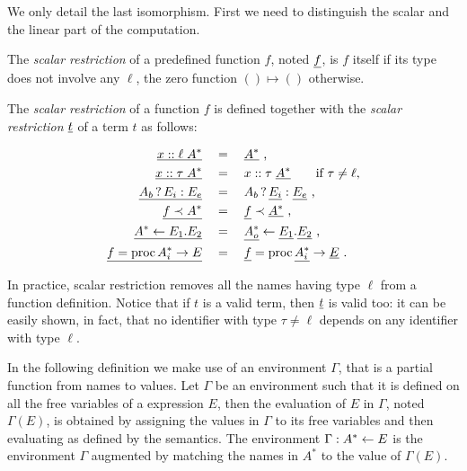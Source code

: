 We only detail the last isomorphism. First we need to distinguish the
scalar and the linear part of the computation.

\begin{definition}
  The \emph{scalar restriction} of a predefined function $f$, noted
  $\underline{f}$, is $f$ itself if its type does not involve any $\ell$, the
  zero function $()\mapsto()$ otherwise. 

  The \emph{scalar restriction} of a \tAL{} function $f$ is defined
  together with the \emph{scalar restriction} $\underline{t}$ of a \tAL{} term
  $t$ as follows:

  \begin{align}
    \underline{x::\ell\;A^\ast} &\quad=\quad \underline{A^\ast} \text{ ,}\\
    \underline{x::\tau\;A^\ast} &\quad=\quad x::\tau\;\underline{A^\ast}
    \qquad\text{if $\tau\ne\ell$,}\\
    \underline{A_b\,?\,E_i:E_e} &\quad=\quad A_b\,?\,\underline{E_i}:\underline{E_e} \text{ ,}\\
    \notag
    \label{eq:scalar-let}
    \underline{f \prec A^\ast} &\quad=\quad \underline{f} \prec \underline{A^\ast}
    \text{ ,}\\
    \underline{A^\ast\leftarrow E_1.E_2} &\quad=\quad \underline{A_o^\ast}\leftarrow\underline{E_1}.\underline{E_2}\text{ ,}\\
    \label{eq:scalar-fun}
    \underline{f = \operatorname{proc} A_i^\ast\rightarrow E} &\quad=\quad \underline{f} = \operatorname{proc} \underline{A_i^\ast}\rightarrow\underline{E}
    \text{ .}
  \end{align}
\end{definition}

In practice, scalar restriction removes all the names having type
$\ell$ from a function definition. Notice that if $t$ is a valid term,
then $\underline{t}$ is valid too: it can be easily shown, in fact, that no
identifier with type $\tau\ne\ell$ depends on any identifier with type
$\ell$.

In the following definition we make use of an environment $\Gamma$,
that is a partial function from names to values.  Let $\Gamma$ be an
environment such that it is defined on all the free variables of a
\tAL{} expression $E$, then the evaluation of $E$ in $\Gamma$, noted
$\Gamma(E)$, is obtained by assigning the values in $\Gamma$ to its
free variables and then evaluating as defined by the semantics.  The
environment $\Gamma:A^\ast\leftarrow E$ is the environment $\Gamma$ augmented
by matching the names in $A^\ast$ to the value of $\Gamma(E)$.

